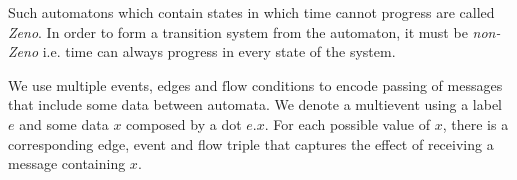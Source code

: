 \begin{comment}
For example, when we define our train control system it is desired that the S of the train is $0$, initially and that remains invariant throughout execution of the automaton $init(Stopped) := invar(Stopped) := S = 0$ , which is captured by the initial predicate $init(Stopped) := S = 0$.  It is also desireable in the states Accelerating and Full Speed that the braking distance is less than or equal to the distance between the train and the end of movement authority $inv(Acc) := inv(Full Speed) := BD(S) \leq DMA(D, EoA)$. The invariant acts as a boundary condition which specifies the limits of the automatons behaviour. In the case of the Full Speed and Accelerating states it ensures that the train can always brake in time and it forces the automaton to perform a transition to the braking state when the boundary of the invariant is reached . If some some reason the system flows into one of these boundaries and no discrete change can occur then time is prevented from continuing.  \end{comment}

Such automatons which contain states in which time cannot progress are called \emph{Zeno}. In order to form a transition system from the automaton, it must be \emph{non-Zeno} i.e. time can always progress in every state of the system. 

\begin{comment}
 In the following specification events are used to pass messages between different automata placed in parallel. An example event is that of $event(Stopped \to Accelerating) :=MA.x.y \ \textbf{if} \ x = TrainID \ \textbf{then} \ EoA' := y$ which is triggered by the RBC and causes the train to update the value of its movement authority. flow conditions describe the rate of change of a given variable over time. In our formalisation of a train one such flow condition is $flow(Accelerating) := \dot{S} = 1$ which causes the train to accelerate at a S of one unit per unit of time.
\end{comment}
\medskip

\begin{myremark}
We use multiple events, edges and $\mathrm{flow}$ conditions to encode passing of messages that include some data between automata.  We denote a multievent using a label $e$ and some data $x$ composed by a dot $e.x$.  For each possible value of $x$, there is a corresponding edge, event and flow triple that captures the effect of receiving a message containing $x$.

\end{myremark}

